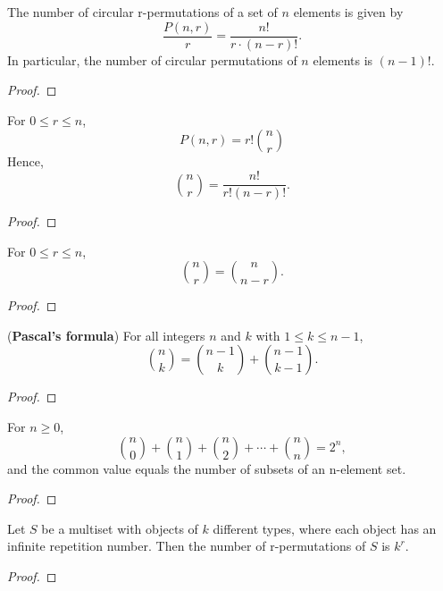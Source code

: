 \begin{theorem}
    \label{thm:2.2.2}
    The number of circular r-permutations of a set of $n$ elements is given by 
    \[\frac{P(n,r)}{r}=\frac{n!}{r\cdot(n-r)!}.\]
    In particular, the number of circular permutations of $n$ elements is $(n - 1)!$.
\end{theorem}
\begin{proof}
\end{proof}

\begin{theorem}
    \label{thm:2.3.1} 
    For $0\leq r \leq n$,
    \[P(n,r)=r!\binom{n}{r}\]
    Hence, 
    \[\binom{n}{r} = \frac{n!}{r! (n-r)!}.\]
\end{theorem}
\begin{proof}
\end{proof}

\begin{corollary}
    \label{cor:2.3.2}
    For $0 \leq r \leq n$,
    \[\binom{n}{r} = \binom{n}{n-r}.\]
\end{corollary}
\begin{proof}
\end{proof}

\begin{theorem}
    \label{thm:2.3.3}
    (\textbf{Pascal's formula}) For all integers $n$ and $k$ with $1 \leq k \leq n-1$,
    \[\binom{n}{k} = \binom{n-1}{k} + \binom{n-1}{k-1}.\]
\end{theorem}
\begin{proof}
\end{proof}

\begin{theorem}
    \label{thm:2.3.4}
    For $n \geq 0$,
    \[\binom{n}{0} + \binom{n}{1} + \binom{n}{2} + \cdots + \binom{n}{n} = 2 ^ {n},\]
    and the common value equals the number of subsets of an n-element set.
\end{theorem}
\begin{proof}
\end{proof}

\begin{theorem}
    \label{thm:2.4.1}
    Let $S$ be a multiset with objects of $k$ different types, where each object has an infinite repetition number. Then the number of r-permutations of $S$ is $k^{r}$.
\end{theorem}
\begin{proof}
\end{proof}

